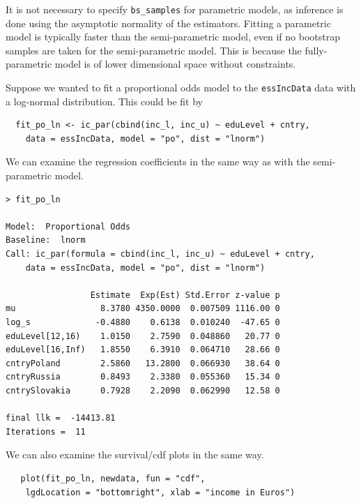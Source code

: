 \documentclass[11pt]{report}
\begin{document}
  It is not necessary to specify \texttt{bs\_samples} for parametric models, as 
  inference is done using the asymptotic normality of the estimators. Fitting a 
  parametric model is typically faster than the semi-parametric model, even if 
  no bootstrap samples are taken for the semi-parametric model. This is because the 
  fully-parametric model is of lower dimensional space without constraints. 
  
  Suppose we wanted to fit a proportional odds model to the \texttt{essIncData} data 
  with a log-normal distribution. This could be fit by
  
  \begin{verbatim}
  fit_po_ln <- ic_par(cbind(inc_l, inc_u) ~ eduLevel + cntry,
    data = essIncData, model = "po", dist = "lnorm")
  \end{verbatim}
  
  We can examine the regression coefficients in the same way as with the semi-parametric model.
  
  \begin{verbatim}
> fit_po_ln

Model:  Proportional Odds 
Baseline:  lnorm 
Call: ic_par(formula = cbind(inc_l, inc_u) ~ eduLevel + cntry, 
    data = essIncData, model = "po", dist = "lnorm")

                 Estimate  Exp(Est) Std.Error z-value p
mu                 8.3780 4350.0000  0.007509 1116.00 0
log_s             -0.4880    0.6138  0.010240  -47.65 0
eduLevel[12,16)    1.0150    2.7590  0.048860   20.77 0
eduLevel[16,Inf)   1.8550    6.3910  0.064710   28.66 0
cntryPoland        2.5860   13.2800  0.066930   38.64 0
cntryRussia        0.8493    2.3380  0.055360   15.34 0
cntrySlovakia      0.7928    2.2090  0.062990   12.58 0

final llk =  -14413.81 
Iterations =  11 
  \end{verbatim}
  
  We can also examine the survival/cdf plots in the same way. 
  
  \begin{verbatim}
   plot(fit_po_ln, newdata, fun = "cdf", 
    lgdLocation = "bottomright", xlab = "income in Euros")
  \end{verbatim}
\end{document}
